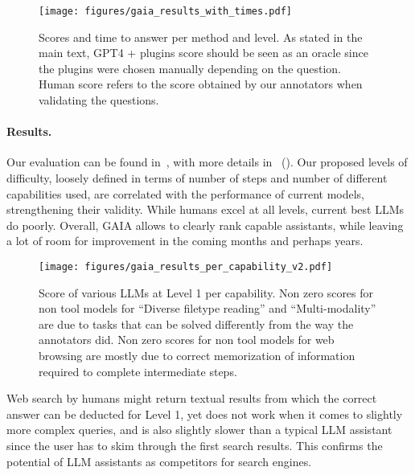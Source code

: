 \documentclass{fairmeta}
\newcommand{\benchmark}{\textsc{GAIA}}
\begin{document}
\vspace{-.2cm}

\begin{figure}[h!]
    \centering
    \texttt{[image: figures/gaia\_results\_with\_times.pdf]}
    \caption{Scores and time to answer per method and level. As stated in the main text, GPT4 + plugins score should be seen as an oracle since the plugins were chosen manually depending on the question. Human score refers to the score obtained by our annotators when validating the questions.}
    \label{fig:eval_results}
\end{figure}

\vspace{-0.4cm}

\paragraph{Results.}  Our evaluation can be found in~, with more details in~ (). Our proposed levels of difficulty, loosely defined in terms of number of steps and number of different capabilities used, are correlated with the performance of current models, strengthening their validity. While humans excel at all levels, current best LLMs do poorly. Overall, \benchmark{} allows to clearly rank capable assistants, while leaving a lot of room for improvement in the coming months and perhaps years.

\begin{wrapfigure}{r}{0.56\textwidth}
    \centering
    \texttt{[image: figures/gaia\_results\_per\_capability\_v2.pdf]}
    \caption{Score of various LLMs at Level 1 per capability. Non zero scores for non tool models for ``Diverse filetype reading'' and ``Multi-modality'' are due to tasks that can be solved differently from the way the annotators did. Non zero scores for non tool models for web browsing are mostly due to correct memorization of information required to complete intermediate steps.}
    \label{fig:eval_results_per_capability}
\end{wrapfigure}

Web search by humans might return textual results from which the correct answer can be deducted for Level 1, yet does not work when it comes to slightly more complex queries, and is also slightly slower than a typical LLM assistant since the user has to skim through the first search results. This confirms the potential of LLM assistants as competitors for search engines. 
\end{document}
